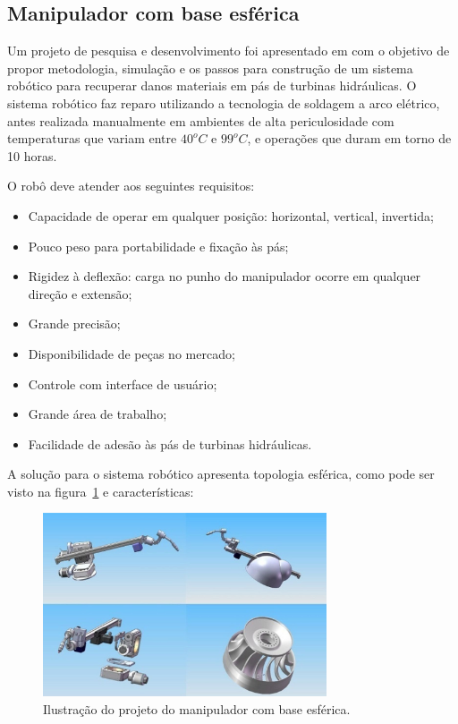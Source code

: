 \subsection{Manipulador com base esférica}
Um projeto de pesquisa e desenvolvimento foi apresentado em
\cite{motta2010prototype} com o objetivo de propor metodologia, simulação e
os passos para construção de um sistema robótico para recuperar danos materiais
em pás de turbinas hidráulicas. O sistema robótico faz
reparo utilizando a tecnologia de soldagem a arco elétrico, antes realizada
manualmente em ambientes de alta periculosidade com temperaturas que variam
entre $40^o C$ e $99^o C$, e operações que duram em torno de 10 horas. 

O robô deve atender aos seguintes requisitos:
\begin{itemize}
  \item Capacidade de operar em qualquer posição: horizontal, vertical,
  invertida;
  \item Pouco peso para portabilidade e fixação às pás;
  \item Rigidez à deflexão: carga no punho do manipulador ocorre em qualquer
  direção e extensão;
  \item Grande precisão;
  \item Disponibilidade de peças no mercado;
  \item Controle com interface de usuário;
  \item Grande área de trabalho;
  \item Facilidade de adesão às pás de turbinas hidráulicas.
\end{itemize}

A solução para o sistema robótico apresenta topologia esférica, como pode ser
visto na figura~\ref{fig:esferico} e características:

\begin{figure}[ht]
\centering
\includegraphics[width=8.4cm]{figs/esferico/esferico.jpg}
\caption{Ilustração do projeto do manipulador com base esférica.}
\label{fig:esferico}
\end{figure}

